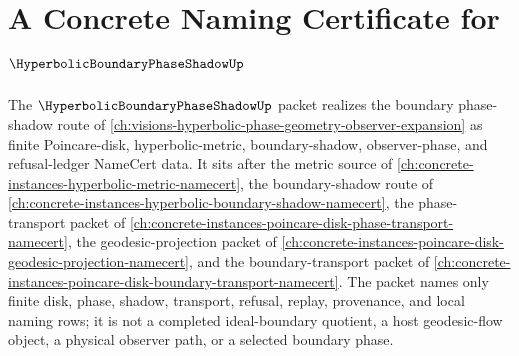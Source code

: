 \chapter{A Concrete Naming Certificate for $\HyperbolicBoundaryPhaseShadowUp$}
\label{ch:concrete-instances-hyperbolic-boundary-phase-shadow-namecert}

The $\HyperbolicBoundaryPhaseShadowUp$ packet realizes the boundary phase-shadow route of \autoref{ch:visions-hyperbolic-phase-geometry-observer-expansion} as finite Poincare-disk, hyperbolic-metric, boundary-shadow, observer-phase, and refusal-ledger NameCert data. It sits after the metric source of \autoref{ch:concrete-instances-hyperbolic-metric-namecert}, the boundary-shadow route of \autoref{ch:concrete-instances-hyperbolic-boundary-shadow-namecert}, the phase-transport packet of \autoref{ch:concrete-instances-poincare-disk-phase-transport-namecert}, the geodesic-projection packet of \autoref{ch:concrete-instances-poincare-disk-geodesic-projection-namecert}, and the boundary-transport packet of \autoref{ch:concrete-instances-poincare-disk-boundary-transport-namecert}. The packet names only finite disk, phase, shadow, transport, refusal, replay, provenance, and local naming rows; it is not a completed ideal-boundary quotient, a host geodesic-flow object, a physical observer path, or a selected boundary phase.

